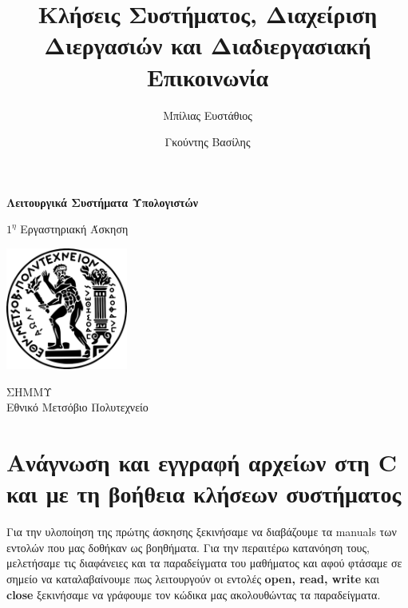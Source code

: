 \documentclass[12pt]{article}
\begin{document}
\author{
    Μπίλιας Ευστάθιος
    \and
    Γκούντης Βασίλης
}

\title{Κλήσεις Συστήματος, Διαχείριση Διεργασιών και Διαδιεργασιακή
    Επικοινωνία}

\begin{titlepage}
    \begin{center}

        \Huge
        \textbf{Λειτουργικά Συστήματα Υπολογιστών}

        \vspace{0.5cm}
        \LARGE
        $1^η$ Εργαστηριακή Άσκηση

        \vspace{0.3cm}
        {\vspace{-2em}\let\newpage\relax\maketitle\vspace{-2em}}

        \vspace{0.8cm}

        \includegraphics[width=0.3\textwidth]{logo.png}

        \vspace{0.8cm}
        \Large
        ΣΗΜΜΥ\\
        Εθνικό Μετσόβιο Πολυτεχνείο\\

    \end{center}
\end{titlepage}

\tableofcontents
\setcounter{page}{2}
\pagebreak

\section{Ανάγνωση και εγγραφή αρχείων στη \foreignlanguage{english}{C} \\ και
  με τη βοήθεια κλήσεων συστήματος}

Για την υλοποίηση της πρώτης άσκησης ξεκινήσαμε να διαβάζουμε τα
\foreignlanguage{english}{manuals} των εντολών που μας δοθήκαν
ως βοηθήματα.
Για την περαιτέρω κατανόηση τους, μελετήσαμε τις διαφάνειες και τα παραδείγματα
του μαθήματος και αφού
φτάσαμε σε σημείο να καταλαβαίνουμε πως λειτουργούν οι εντολές
\textbf{\foreignlanguage{english}{open, read, write}} και
\textbf{\foreignlanguage{english}{close}} ξεκινήσαμε να γράφουμε τον κώδικα μας
ακολουθώντας τα παραδείγματα.
\end{document}
